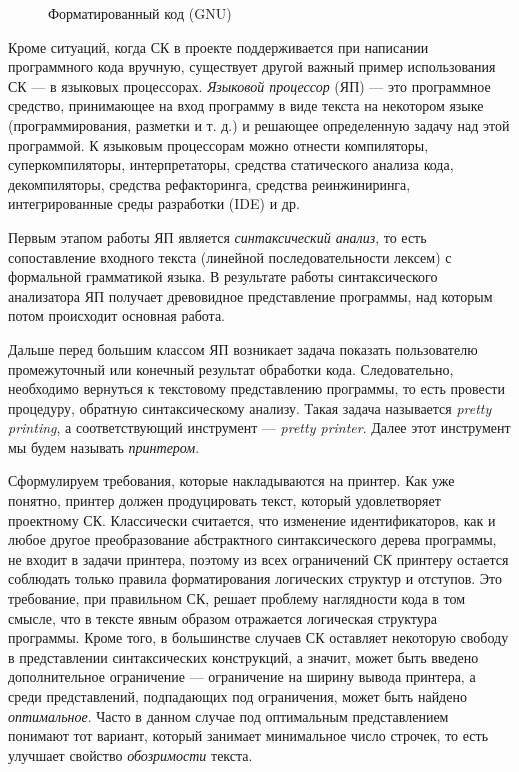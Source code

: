 \begin{figure}[h!]
	\centering
	
  \caption{Форматированный код (GNU)}
	\label{fig:wikiExGNU}
\end{figure}

Кроме ситуаций, когда СК в проекте поддерживается при написании
программного кода вручную, существует другой важный пример использования СК ---
в языковых процессорах. \emph{Языковой процессор} (ЯП) ---
это программное средство, принимающее на вход программу в виде текста
на некотором языке (программирования, разметки и т. д.) и решающее
определенную задачу над этой программой. К языковым процессорам можно
отнести компиляторы, суперкомпиляторы, интерпретаторы,
средства статического анализа кода, декомпиляторы, средства рефакторинга,
средства реинжиниринга, интегрированные среды разработки (IDE) и др.

Первым этапом работы ЯП является \emph{синтаксический анализ}, то есть
сопоставление входного текста (линейной последовательности лексем) с формальной
грамматикой языка. В результате работы синтаксического анализатора ЯП получает
древовидное представление программы, над которым потом происходит основная работа.

Дальше перед большим классом ЯП возникает задача показать пользователю
промежуточный или конечный результат обработки кода.
Следовательно, необходимо вернуться к текстовому представлению программы,
то есть провести процедуру, обратную синтаксическому анализу. Такая задача
называется \emph{pretty printing}, а соответствующий инструмент ---
\emph{pretty printer}. Далее этот инструмент мы будем называть
\emph{принтером}.

Сформулируем требования, которые накладываются на принтер.
Как уже понятно, принтер должен
продуцировать текст, который удовлетворяет проектному СК.
Классически считается, что изменение идентификаторов, как и любое другое
преобразование абстрактного синтаксического дерева программы, не входит в
задачи принтера, поэтому из всех ограничений СК принтеру остается 
соблюдать только правила форматирования логических структур и отступов.
Это требование, при правильном СК, решает проблему наглядности кода в том смысле,
что в тексте явным образом отражается логическая структура программы.
Кроме того, в большинстве случаев СК оставляет некоторую свободу в представлении
синтаксических конструкций, а значит, может быть введено дополнительное
ограничение --- ограничение на ширину вывода принтера, а среди 
представлений, подпадающих под ограничения, может быть
найдено \emph{оптимальное}. Часто в данном случае под
оптимальным представлением понимают тот вариант,
который занимает минимальное число строчек,
то есть улучшает свойство \emph{обозримости} текста.

